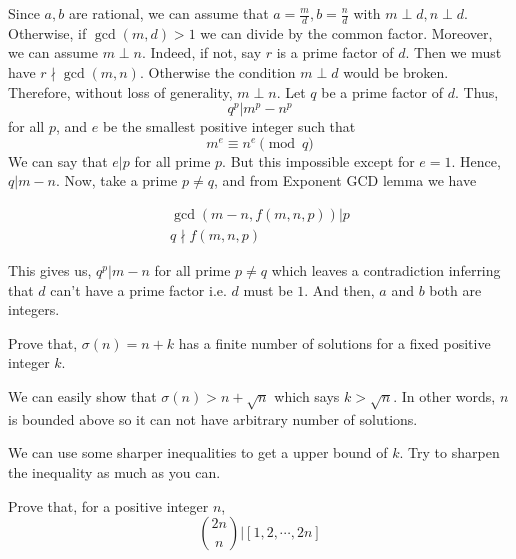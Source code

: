 \documentclass[problems.tex]{subfile}
\begin{document}
	\begin{solution}
		Since $a,b$ are rational, we can assume that $a=\frac{m}{d},b=\frac{n}{d}$ with $m\perp d,n\perp d$. Otherwise, if $\gcd(m,d)>1$ we can divide by the common factor. Moreover, we can assume $m\perp n$. Indeed, if not, say $r$ is a prime factor of $d$. Then we must have $r\nmid\gcd(m,n)$. Otherwise the condition $m\perp d$ would be broken. Therefore, without loss of generality, $m\perp n$. Let $q$ be a prime factor of $d$. Thus, \[q^p|m^p-n^p\] for all $p$, and $e$ be the smallest positive integer such that \[m^e\equiv n^e\pmod q\]
		We can say that $e|p$ for all prime $p$. But this impossible except for $e=1$. Hence, $q|m-n$. Now, take a prime $p\neq q$, and from Exponent GCD lemma we have 
		
		\begin{align*}
			\gcd\left(m-n,f(m,n,p)\right) | p\\
			q\nmid  f(m,n,p)
		\end{align*}
		
		
		
		This gives us, $q^p|m-n$ for all prime $p\neq q$ which leaves a contradiction inferring that $d$ can't have a prime factor i.e. $d$ must be $1$. And then, $a$ and $b$ both are integers.
	\end{solution}
	
	\begin{problem}
		Prove that, $\sigma(n)=n+k$ has a finite number of solutions for a fixed positive integer $k$.
	\end{problem}
	
	\begin{solution}
		We can easily show that $\sigma(n)>n+\sqrt{n}$ which says $k>\sqrt{n}$. In other words, $n$ is bounded above so it can not have arbitrary number of solutions.
	\end{solution}
	
	\begin{note}
		We can use some sharper inequalities to get a upper bound of $k$. Try to sharpen the inequality as much as you can.
	\end{note}
	
	\begin{problem}
		Prove that, for a positive integer $n$, \[\binom{2n}{n}|[1,2,\cdots,2n]\]
	\end{problem}
	
\end{document}

